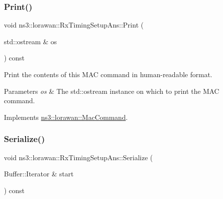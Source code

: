 \mbox{\label{classns3_1_1lorawan_1_1RxTimingSetupAns_a477b8b609277cd43f5cd85696e8aae06}} 
\subsubsection{\texorpdfstring{Print()}{Print()}}
{\footnotesize\ttfamily void ns3\+::lorawan\+::\+Rx\+Timing\+Setup\+Ans\+::\+Print (\begin{DoxyParamCaption}\item[{std\+::ostream \&}]{os }\end{DoxyParamCaption}) const\hspace{0.3cm}{\ttfamily [virtual]}}

Print the contents of this M\+AC command in human-\/readable format.


\begin{DoxyParams}{Parameters}
{\em os} & The std\+::ostream instance on which to print the M\+AC command. \\
\hline
\end{DoxyParams}


Implements \hyperlink{classns3_1_1lorawan_1_1MacCommand_a6bf88db38dab7dcd817811a9fb59f920}{ns3\+::lorawan\+::\+Mac\+Command}.

\mbox{\label{classns3_1_1lorawan_1_1RxTimingSetupAns_a582c4325ac60d1708a20717cbd713d1f}} 
\subsubsection{\texorpdfstring{Serialize()}{Serialize()}}
{\footnotesize\ttfamily void ns3\+::lorawan\+::\+Rx\+Timing\+Setup\+Ans\+::\+Serialize (\begin{DoxyParamCaption}\item[{Buffer\+::\+Iterator \&}]{start }\end{DoxyParamCaption}) const\hspace{0.3cm}{\ttfamily [virtual]}}

